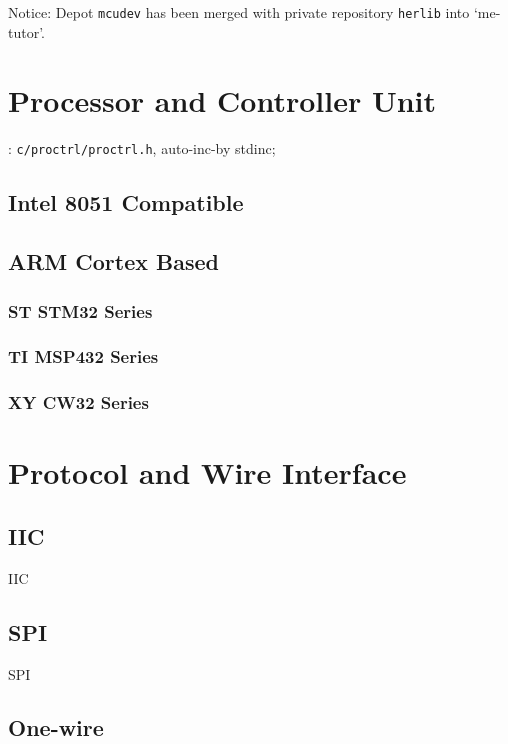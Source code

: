 Notice: Depot \verb`mcudev` has been merged with private repository \verb`herlib` into `me-tutor'.

\section{Processor and Controller Unit}
:
\verb`c/proctrl/proctrl.h`, auto-inc-by stdinc;


\subsection{Intel 8051 Compatible}

\subsection{ARM Cortex Based}

\subsubsection{ST STM32 Series}

\subsubsection{TI MSP432 Series}

\subsubsection{XY CW32 Series}

\section{Protocol and Wire Interface}

\subsection{IIC}
{IIC}

\subsection{SPI}
{SPI}

\subsection{One-wire}


